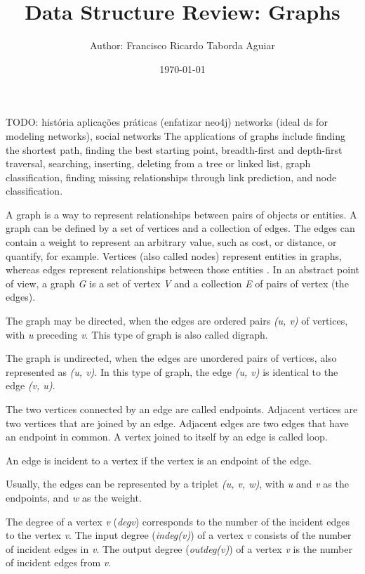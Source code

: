 \documentclass[a4paper]{article}
\title{
    Data Structure Review: Graphs\\
}
\author{
    \small{Author: Francisco Ricardo Taborda Aguiar}\\
}
\date{\today}
\begin{document}
    \maketitle


    TODO:
    história
    aplicações práticas (enfatizar neo4j)
        networks (ideal ds for modeling networks), social networks
        The applications of graphs include finding the shortest path, 
        finding the best starting point, breadth-first and depth-first 
        traversal, searching, inserting, deleting from a tree or 
        linked list, graph classification, finding missing relationships 
        through link prediction, and node classification.

    A graph is a way to represent relationships between pairs 
    of objects \cite{goodrich:2014} or entities.
    A graph can be defined by a set of vertices and a collection 
    of edges. The edges can contain a weight to represent an 
    arbitrary value, such as cost, or distance, or quantify, 
    for example.
    Vertices (also called nodes) represent entities in graphs, 
    whereas edges represent 
    relationships between those entities \cite{xia:2021}.
    In an abstract point of view, a graph \emph{G} is a set of vertex 
    \emph{V} and a collection \emph{E} of pairs of vertex (the edges).

    The graph may be directed, when the edges are ordered pairs 
    \emph{(u, v)} of vertices, with \emph{u} preceding \emph{v}.
    This type of graph is also called digraph.

    The graph is undirected, when the edges are unordered pairs of 
    vertices, also represented as \emph{(u, v)}. In this type of 
    graph, the edge \emph{(u, v)} is identical to the edge 
    \emph{(v, u)}.

    
    The two vertices connected by an edge are called endpoints.
    Adjacent vertices are two vertices that are joined by an edge.
    Adjacent edges are two edges that have an endpoint in common.
    A vertex joined to itself by an edge is called loop.

    An edge is incident to a vertex if the vertex is an endpoint of
    the edge.

    Usually, the edges can be represented by a triplet 
    \emph{(u, v, w)}, with \emph{u} and \emph{v} as 
    the endpoints, and \emph{w} as the weight.

    The degree of a vertex \emph{v} (\emph{deg{v}}) corresponds to 
    the number of the incident edges to the vertex \emph{v}.
    The input degree (\emph{indeg(v)}) of a vertex \emph{v} consists 
    of the number of incident edges in \emph{v}.
    The output degree (\emph{outdeg(v)}) of a vertex \emph{v} is the 
    number of incident edges from \emph{v}.
\end{document}
